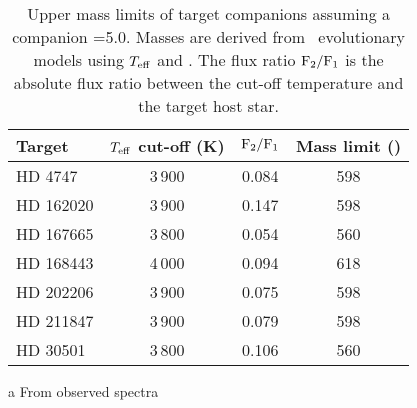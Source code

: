\begin{table}
       \centering
  \begin{threeparttable}

       \caption{Upper mass limits of target companions assuming a companion \logg{}=5.0. Masses are derived from~\citet{baraffe_new_2015} evolutionary models using \(T_{\mathrm{eff}}{}\) and \logg{}. The flux ratio \(\rm F_2/F_1\) is  the absolute flux ratio between the cut-off temperature and the target host star.}

        \begin{tabular}{l c c c}
            \toprule
            Target & $T_{\mathrm{eff}}{}$ cut-off (K) & \(\rm F_2/F_1\) & Mass limit (\Mjup{})\\
            \midrule
            {HD 4747}     &  3\,900 & 0.084 & 598 \\
            {HD 162020} & 3\,900 & 0.147 & 598 \\
            {HD 167665} & 3\,800 & 0.054 & 560 \\
            {HD 168443} & 4\,000 & 0.094 & 618 \\
            {HD 202206} & 3\,900 & 0.075 & 598 \\
            {HD 211847} & 3\,900 & 0.079 & 598 \\
            {HD 30501}   & 3\,800\tnote{a} & 0.106 & 560 \\
            \bottomrule
        \end{tabular}
        \label{tab:mass_limits}
        \begin{tablenotes}[flushleft]
            \small
                \item [a] {From observed spectra }
        \end{tablenotes}
  \end{threeparttable}

\end{table}
